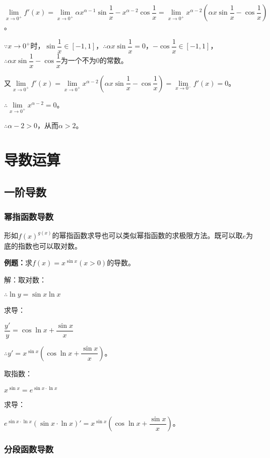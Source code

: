 $\lim\limits_{x\to 0^+}f'(x)=\lim\limits_{x\to 0^+}\alpha x^{\alpha-1}\sin\dfrac{1}{x}-x^{\alpha-2}\cos\dfrac{1}{x}=\lim\limits_{x\to 0^+}x^{\alpha-2}\left(\alpha x\sin\dfrac{1}{x}-\cos\dfrac{1}{x}\right)$。

$\because x\to 0^+$时，$\sin\dfrac{1}{x}\in[-1,1]$，$\therefore\alpha x\sin\dfrac{1}{x}=0$，$-\cos\dfrac{1}{x}\in[-1,1]$，$\therefore \alpha x\sin\dfrac{1}{x}-\cos\dfrac{1}{x}$为一个不为0的常数。

又$\lim\limits_{x\to 0^+}f'(x)=\lim\limits_{x\to 0^+}x^{\alpha-2}\left(\alpha x\sin\dfrac{1}{x}-\cos\dfrac{1}{x}\right)=\lim\limits_{x\to 0^-}f'(x)=0$。

$\therefore\lim\limits_{x\to 0^+}x^{\alpha-2}=0$。

$\therefore\alpha-2>0$，从而$\alpha>2$。

\section{导数运算}

\subsection{一阶导数}

\subsubsection{幂指函数导数}

形如$f(x)^{g(x)}$的幂指函数求导也可以类似幂指函数的求极限方法。既可以取$e$为底的指数也可以取对数。

\textbf{例题：}求$f(x)=x^{\sin x}(x>0)$的导数。

解：取对数：

$\therefore\ln y=\sin x\ln x$

求导：

$\dfrac{y'}{y}=\cos\ln x+\dfrac{\sin x}{x}$

$\therefore y'=x^{\sin x}\left(\cos\ln x+\dfrac{\sin x}{x}\right)$。

取指数：

$x^{\sin x}=e^{\sin x\cdot\ln x}$

求导：

$e^{\sin x\cdot\ln x}(\sin x\cdot\ln x)'=x^{\sin x}\left(\cos\ln x+\dfrac{\sin x}{x}\right)$。

\subsubsection{分段函数导数}


